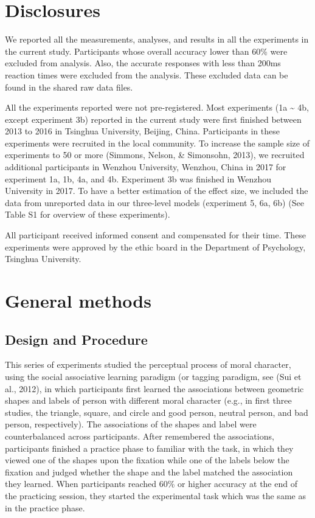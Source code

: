 \documentclass[
  man]{apa6}
\begin{document}
\hypertarget{disclosures}{%
\section{Disclosures}\label{disclosures}}

We reported all the measurements, analyses, and results in all the experiments in the current study. Participants whose overall accuracy lower than 60\% were excluded from analysis. Also, the accurate responses with less than 200ms reaction times were excluded from the analysis. These excluded data can be found in the shared raw data files.

All the experiments reported were not pre-registered. Most experiments (1a \textasciitilde{} 4b, except experiment 3b) reported in the current study were first finished between 2013 to 2016 in Tsinghua University, Beijing, China. Participants in these experiments were recruited in the local community. To increase the sample size of experiments to 50 or more (Simmons, Nelson, \& Simonsohn, 2013), we recruited additional participants in Wenzhou University, Wenzhou, China in 2017 for experiment 1a, 1b, 4a, and 4b. Experiment 3b was finished in Wenzhou University in 2017. To have a better estimation of the effect size, we included the data from unreported data in our three-level models (experiment 5, 6a, 6b) (See Table S1 for overview of these experiments).

All participant received informed consent and compensated for their time. These experiments were approved by the ethic board in the Department of Psychology, Tsinghua University.

\hypertarget{general-methods}{%
\section{General methods}\label{general-methods}}

\hypertarget{design-and-procedure}{%
\subsection{Design and Procedure}\label{design-and-procedure}}

This series of experiments studied the perceptual process of moral character, using the social associative learning paradigm (or tagging paradigm, see (Sui et al., 2012), in which participants first learned the associations between geometric shapes and labels of person with different moral character (e.g., in first three studies, the triangle, square, and circle and good person, neutral person, and bad person, respectively). The associations of the shapes and label were counterbalanced across participants. After remembered the associations, participants finished a practice phase to familiar with the task, in which they viewed one of the shapes upon the fixation while one of the labels below the fixation and judged whether the shape and the label matched the association they learned. When participants reached 60\% or higher accuracy at the end of the practicing session, they started the experimental task which was the same as in the practice phase.
\end{document}
